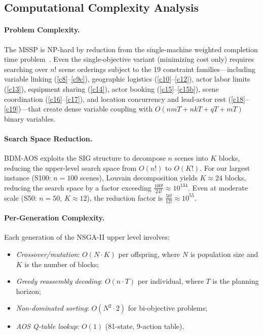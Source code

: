 \subsection{Computational Complexity Analysis}
\label{sec:complexity}

\paragraph{Problem Complexity.}
The MSSP is NP-hard by reduction from the single-machine weighted completion time problem~\citep{garey1979, pinedo2016}.
Even the single-objective variant (minimizing cost only) requires searching over $n!$ scene orderings subject to the 19 constraint families---including variable linking (\ref{c8}--\ref{c9c}), geographic logistics (\ref{c10}--\ref{c12}), actor labor limits (\ref{c13}), equipment sharing (\ref{c14}), actor booking (\ref{c15}--\ref{c15b}), scene coordination (\ref{c16}--\ref{c17}), and location concurrency and lead-actor rest (\ref{c18}--\ref{c19})---that create dense variable coupling with $O(nmT + nkT + qT + mT)$ binary variables.

\paragraph{Search Space Reduction.}
BDM-AOS exploits the SIG structure to decompose $n$ scenes into $K$ blocks, reducing the upper-level search space from $O(n!)$ to $O(K!)$.
For our largest instance (S100: $n=100$ scenes), Louvain decomposition yields $K \approx 24$ blocks, reducing the search space by a factor exceeding $\frac{100!}{24!} \approx 10^{134}$.
Even at moderate scale (S50: $n=50$, $K \approx 12$), the reduction factor is $\frac{50!}{12!} \approx 10^{55}$.

\paragraph{Per-Generation Complexity.}
Each generation of the NSGA-II upper level involves:
\begin{itemize}
    \item \textit{Crossover/mutation}: $O(N \cdot K)$ per offspring, where $N$ is population size and $K$ is the number of blocks;
    \item \textit{Greedy reassembly decoding}: $O(n \cdot T)$ per individual, where $T$ is the planning horizon;
    \item \textit{Non-dominated sorting}: $O(N^2 \cdot 2)$ for bi-objective problems;
    \item \textit{AOS Q-table lookup}: $O(1)$ (81-state, 9-action table).
\end{itemize}

